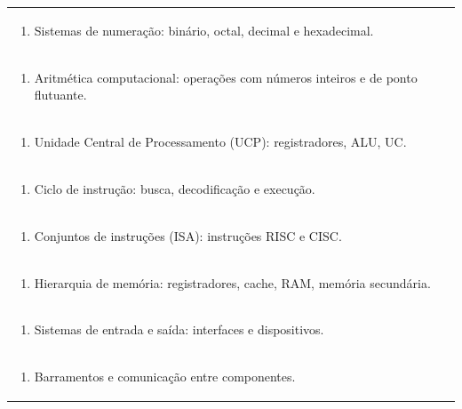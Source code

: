 \documentclass[11pt]{article}
\begin{document}
\begin{center}
\begin{longtable}{|p{4cm}|p{4cm}|p{4cm}|p{4cm}|}
\multicolumn{4}{|p{\dimexpr 16cm + 6\tabcolsep\relax}|}{\begin{enumerate}[start=2]\item Sistemas de numeração: binário, octal, decimal e hexadecimal.\end{enumerate}}\\
\multicolumn{4}{|p{\dimexpr 16cm + 6\tabcolsep\relax}|}{\begin{enumerate}[start=3]\item Aritmética computacional: operações com números inteiros e de ponto flutuante.\end{enumerate}}\\
\multicolumn{4}{|p{\dimexpr 16cm + 6\tabcolsep\relax}|}{\begin{enumerate}[start=4]\item Unidade Central de Processamento (UCP): registradores, ALU, UC.\end{enumerate}}\\
\multicolumn{4}{|p{\dimexpr 16cm + 6\tabcolsep\relax}|}{\begin{enumerate}[start=5]\item Ciclo de instrução: busca, decodificação e execução.\end{enumerate}}\\
\multicolumn{4}{|p{\dimexpr 16cm + 6\tabcolsep\relax}|}{\begin{enumerate}[start=6]\item Conjuntos de instruções (ISA): instruções RISC e CISC.\end{enumerate}}\\
\multicolumn{4}{|p{\dimexpr 16cm + 6\tabcolsep\relax}|}{\begin{enumerate}[start=7]\item Hierarquia de memória: registradores, cache, RAM, memória secundária.\end{enumerate}}\\
\multicolumn{4}{|p{\dimexpr 16cm + 6\tabcolsep\relax}|}{\begin{enumerate}[start=8]\item Sistemas de entrada e saída: interfaces e dispositivos.\end{enumerate}}\\
\multicolumn{4}{|p{\dimexpr 16cm + 6\tabcolsep\relax}|}{\begin{enumerate}[start=9]\item Barramentos e comunicação entre componentes.\end{enumerate}}\\

\end{longtable}
\end{center}
\end{document}
